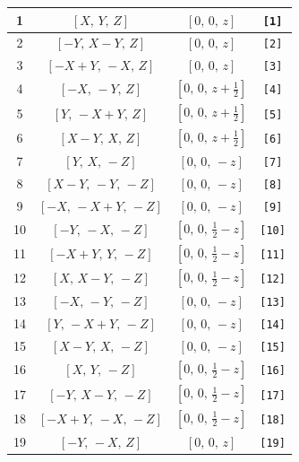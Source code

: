 \documentclass[fleqn,8pt]{jsarticle}
\begin{document}
\begin{longtable}{cccc}
1 & $\left[ X,\, Y,\, Z \right]$ & $\left[ 0,\, 0,\, z \right]$ & {\tt [1]} \\ \hline
2 & $\left[ - Y,\, X - Y,\, Z \right]$ & $\left[ 0,\, 0,\, z \right]$ & {\tt [2]} \\ \hline
3 & $\left[ - X + Y,\, - X,\, Z \right]$ & $\left[ 0,\, 0,\, z \right]$ & {\tt [3]} \\ \hline
4 & $\left[ - X,\, - Y,\, Z \right]$ & $\left[ 0,\, 0,\, z + \frac{1}{2} \right]$ & {\tt [4]} \\ \hline
5 & $\left[ Y,\, - X + Y,\, Z \right]$ & $\left[ 0,\, 0,\, z + \frac{1}{2} \right]$ & {\tt [5]} \\ \hline
6 & $\left[ X - Y,\, X,\, Z \right]$ & $\left[ 0,\, 0,\, z + \frac{1}{2} \right]$ & {\tt [6]} \\ \hline
7 & $\left[ Y,\, X,\, - Z \right]$ & $\left[ 0,\, 0,\, - z \right]$ & {\tt [7]} \\ \hline
8 & $\left[ X - Y,\, - Y,\, - Z \right]$ & $\left[ 0,\, 0,\, - z \right]$ & {\tt [8]} \\ \hline
9 & $\left[ - X,\, - X + Y,\, - Z \right]$ & $\left[ 0,\, 0,\, - z \right]$ & {\tt [9]} \\ \hline
10 & $\left[ - Y,\, - X,\, - Z \right]$ & $\left[ 0,\, 0,\, \frac{1}{2} - z \right]$ & {\tt [10]} \\ \hline
11 & $\left[ - X + Y,\, Y,\, - Z \right]$ & $\left[ 0,\, 0,\, \frac{1}{2} - z \right]$ & {\tt [11]} \\ \hline
12 & $\left[ X,\, X - Y,\, - Z \right]$ & $\left[ 0,\, 0,\, \frac{1}{2} - z \right]$ & {\tt [12]} \\ \hline
13 & $\left[ - X,\, - Y,\, - Z \right]$ & $\left[ 0,\, 0,\, - z \right]$ & {\tt [13]} \\ \hline
14 & $\left[ Y,\, - X + Y,\, - Z \right]$ & $\left[ 0,\, 0,\, - z \right]$ & {\tt [14]} \\ \hline
15 & $\left[ X - Y,\, X,\, - Z \right]$ & $\left[ 0,\, 0,\, - z \right]$ & {\tt [15]} \\ \hline
16 & $\left[ X,\, Y,\, - Z \right]$ & $\left[ 0,\, 0,\, \frac{1}{2} - z \right]$ & {\tt [16]} \\ \hline
17 & $\left[ - Y,\, X - Y,\, - Z \right]$ & $\left[ 0,\, 0,\, \frac{1}{2} - z \right]$ & {\tt [17]} \\ \hline
18 & $\left[ - X + Y,\, - X,\, - Z \right]$ & $\left[ 0,\, 0,\, \frac{1}{2} - z \right]$ & {\tt [18]} \\ \hline
19 & $\left[ - Y,\, - X,\, Z \right]$ & $\left[ 0,\, 0,\, z \right]$ & {\tt [19]} \\ \hline

\end{longtable}
\end{document}
